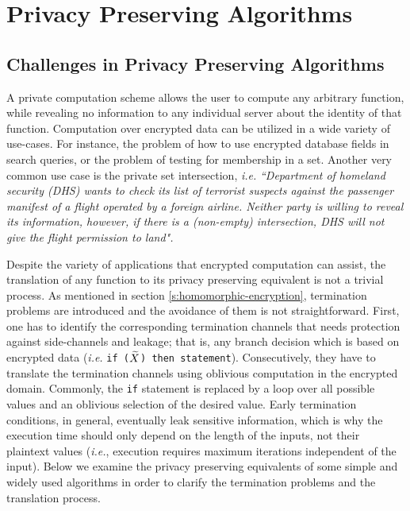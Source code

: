 \chapter{Privacy Preserving Algorithms}\label{c:pp-algorithms}

\section{Challenges in Privacy Preserving Algorithms}\label{s:challenges}
A private computation scheme allows the user to compute any arbitrary function, while revealing no information to any individual server about the identity of that function.
Computation over encrypted data can be utilized in a wide variety of use-cases.
For instance, the problem of how to use encrypted database fields in search queries, or the problem of testing for membership in a set.
Another very common use case is the private set intersection, \textit{i.e.} \textit{``Department of homeland security (DHS) wants to check its list of terrorist suspects against the passenger manifest of a flight operated by a foreign airline.
Neither party is willing to reveal its information, however, if there is a (non-empty) intersection, DHS will not give the flight permission to land".}


Despite the variety of applications that encrypted computation can assist, the translation of any function to its privacy preserving equivalent is not a trivial process.
As mentioned in section \ref{s:homomorphic-encryption}, termination problems are introduced and the avoidance of them is not straightforward.
First, one has to identify the corresponding termination channels that needs protection against side-channels and leakage; that is, any branch decision which is based on encrypted data (\textit{i.e.} \texttt{if ($\widetilde{X}$) then statement}).
Consecutively, they have to translate the termination channels using oblivious computation in the encrypted domain.
Commonly, the \texttt{if} statement is replaced by a loop over all possible values and an oblivious selection of the desired value.
Early termination conditions, in general, eventually leak sensitive information, which is why the execution time should only depend on the length of the inputs, not their plaintext values (\textit{i.e.}, execution requires maximum iterations independent of the input).
Below we examine the privacy preserving equivalents of some simple and widely used algorithms in order to clarify the termination problems and the translation process.


